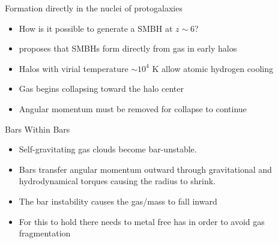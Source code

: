 \documentclass{beamer}
\begin{document}
\usebackgroundtemplate{}


\begin{frame}{Formation directly in the nuclei of protogalaxies}
\begin{itemize}
\item How is it possible to generate a SMBH at $z \sim 6$?
\vspace{0.2cm}
\item \cite{Begelman2006} proposes that SMBHs form directly from gas in early halos
\vspace{0.2cm}
\item Halos with virial temperature $\sim10^4$ K allow atomic hydrogen cooling
\vspace{0.2cm}
\item Gas begins collapsing toward the halo center
\vspace{0.2cm}
\item Angular momentum must be removed for collapse to continue
\end{itemize}
\end{frame}


\begin{frame}{Bars Within Bars}
\begin{itemize}
\item Self-gravitating gas clouds become bar-unstable.
\vspace{0.2cm}
\item Bars transfer angular momentum outward through gravitational and hydrodynamical torques causing the radius to shrink.
\vspace{0.2cm}
\item The bar instability causes the gas/mass to fall inward
\vspace{0.2cm}
\item For this to hold there needs to metal free has in order to avoid gas fragmentation
\end{itemize}
\end{frame}

\end{document}
